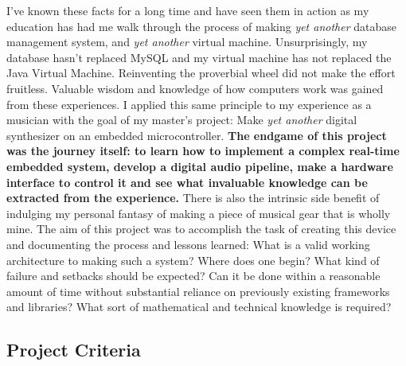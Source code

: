 \documentclass[acmlarge,screen]{acmart}
\begin{document}
	I've known these facts for a long time and have seen them in action as my education has had me walk through the process of making \textit{yet another} database management system, and \textit{yet another} virtual machine. Unsurprisingly, my database hasn't replaced MySQL and my virtual machine has not replaced the Java Virtual Machine. Reinventing the proverbial wheel did not make the effort fruitless. Valuable wisdom and knowledge of how computers work was gained from these experiences. I applied this same principle to my experience as a musician with the goal of my master's project: Make \textit{yet another} digital synthesizer on an embedded microcontroller. \textbf{The endgame of this project was the journey itself: to learn how to implement a complex real-time embedded system, develop a digital audio pipeline, make a hardware interface to control it and see what invaluable knowledge can be extracted from the experience.} There is also the intrinsic side benefit of indulging my personal fantasy of making a piece of musical gear that is wholly mine. The aim of this project was to accomplish the task of creating this device and documenting the process and lessons learned: What is a valid working architecture to making such a system? Where does one begin? What kind of failure and setbacks should be expected? Can it be done within a reasonable amount of time without substantial reliance on previously existing frameworks and libraries? What sort of mathematical and technical knowledge is required?

\subsection{Project Criteria}
\end{document}
